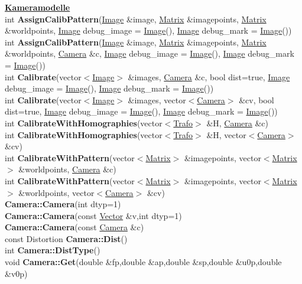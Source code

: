 \documentclass[10pt,titlepage]{article}
\newcommand{\subtitle}[1]{{\noindent\bf#1}}
\def\functionlistentry#1#2#3#4#5#6{\noindent #1 {\bf #2}(#3) \dotfill #6\\}
\begin{document}
{{\subtitle{\hyperlink{SECTION:cameraModel}{Kameramodelle}}\\
\functionlistentry{int}{AssignCalibPattern}{\hyperlink{Image}{Image} \&image, \hyperlink{Matrix}{Matrix} \&imagepoints, \hyperlink{Matrix}{Matrix} \&worldpoints, \hyperlink{Image}{Image} debug\_image = \hyperlink{Image}{Image}(), \hyperlink{Image}{Image} debug\_mark = \hyperlink{Image}{Image}()}{794}{cameraModel}{}
\functionlistentry{int}{AssignCalibPattern}{\hyperlink{Image}{Image} \&image, \hyperlink{Matrix}{Matrix} \&imagepoints, \hyperlink{Matrix}{Matrix} \&worldpoints, \hyperlink{Camera}{Camera} \&c, \hyperlink{Image}{Image} debug\_image = \hyperlink{Image}{Image}(), \hyperlink{Image}{Image} debug\_mark = \hyperlink{Image}{Image}()}{795}{cameraModel}{}
\functionlistentry{int}{Calibrate}{vector$<$\hyperlink{Image}{Image}$>$ \&images, \hyperlink{Camera}{Camera} \&c, bool dist=true, \hyperlink{Image}{Image} debug\_image = \hyperlink{Image}{Image}(), \hyperlink{Image}{Image} debug\_mark = \hyperlink{Image}{Image}()}{792}{cameraModel}{}
\functionlistentry{int}{Calibrate}{vector$<$\hyperlink{Image}{Image}$>$ \&images, vector$<$\hyperlink{Camera}{Camera}$>$ \&cv, bool dist=true, \hyperlink{Image}{Image} debug\_image = \hyperlink{Image}{Image}(), \hyperlink{Image}{Image} debug\_mark = \hyperlink{Image}{Image}()}{793}{cameraModel}{}
\functionlistentry{int}{CalibrateWithHomographies}{vector$<$\hyperlink{Trafo}{Trafo}$>$ \&H, \hyperlink{Camera}{Camera} \&c}{799}{cameraModel}{}
\functionlistentry{int}{CalibrateWithHomographies}{vector$<$\hyperlink{Trafo}{Trafo}$>$ \&H, vector$<$\hyperlink{Camera}{Camera}$>$ \&cv}{800}{cameraModel}{}
\functionlistentry{int}{CalibrateWithPattern}{vector$<$\hyperlink{Matrix}{Matrix}$>$ \&imagepoints, vector$<$\hyperlink{Matrix}{Matrix}$>$ \&worldpoints, \hyperlink{Camera}{Camera} \&c}{797}{cameraModel}{}
\functionlistentry{int}{CalibrateWithPattern}{vector$<$\hyperlink{Matrix}{Matrix}$>$ \&imagepoints, vector$<$\hyperlink{Matrix}{Matrix}$>$ \&worldpoints, vector$<$\hyperlink{Camera}{Camera}$>$ \&cv}{798}{cameraModel}{}
\functionlistentry{}{Camera::Camera}{int dtyp=1}{770}{cameraModel}{}
\functionlistentry{}{Camera::Camera}{const \hyperlink{Vector}{Vector} \&v,int dtyp=1}{771}{cameraModel}{}
\functionlistentry{}{Camera::Camera}{const \hyperlink{Camera}{Camera} \&c}{772}{cameraModel}{}
\functionlistentry{const Distortion}{Camera::Dist}{}{779}{cameraModel}{}
\functionlistentry{int}{Camera::DistType}{}{780}{cameraModel}{}
\functionlistentry{void}{Camera::Get}{double \&fp,double \&ap,double \&sp,double \&u0p,double \&v0p}{777}{cameraModel}{}
}}
\end{document}
